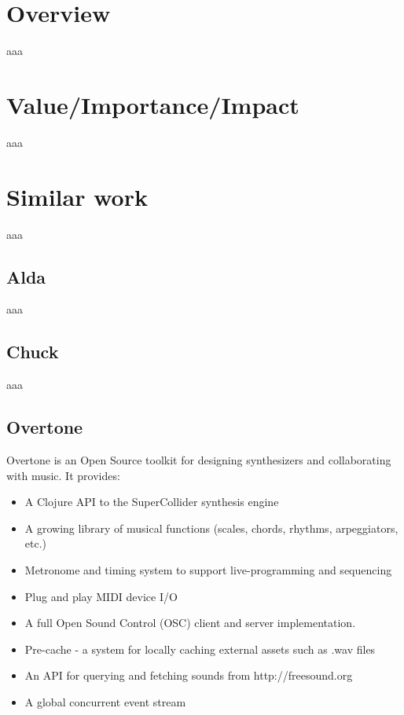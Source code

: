 \section{Overview}

aaa

\section{Value/Importance/Impact}

aaa

\section{Similar work}

aaa

\subsection{Alda}

aaa

\subsection{Chuck}

aaa

\subsection{Overtone}

Overtone is an Open Source toolkit for designing synthesizers and collaborating with music. It provides\cite{Aaron16}:
\begin{itemize}
\item A Clojure API to the SuperCollider synthesis engine
\item A growing library of musical functions (scales, chords, rhythms, arpeggiators, etc.)
\item Metronome and timing system to support live-programming and sequencing
\item Plug and play MIDI device I/O
\item A full Open Sound Control (OSC) client and server implementation.
\item Pre-cache - a system for locally caching external assets such as .wav files
\item An API for querying and fetching sounds from http://freesound.org
\item A global concurrent event stream
\end{itemize}

